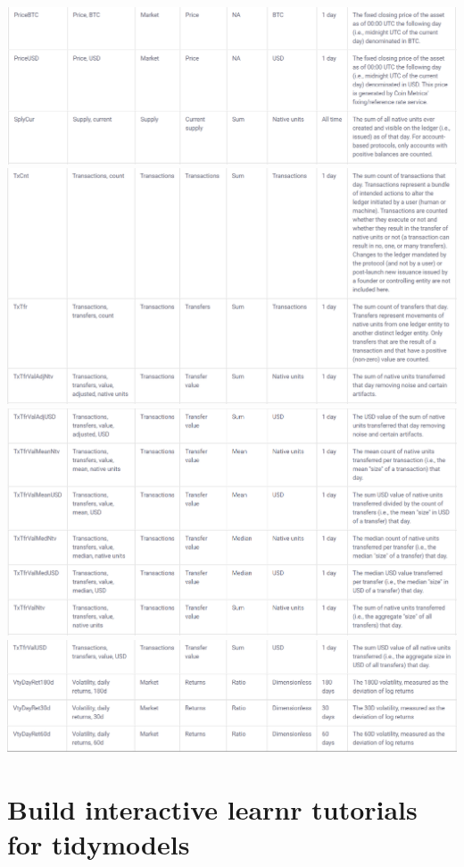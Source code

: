 \documentclass[
]{book}
\begin{document}
\includegraphics{images/coinmetrics_datadictionary5.png}
\includegraphics{images/coinmetrics_datadictionary6.png}
\includegraphics{images/coinmetrics_datadictionary7.png}
\includegraphics{images/coinmetrics_datadictionary8.png}

\hypertarget{build-interactive-learnr-tutorials-for-tidymodels}{%
\section{Build interactive learnr tutorials for tidymodels}\label{build-interactive-learnr-tutorials-for-tidymodels}}
\end{document}
